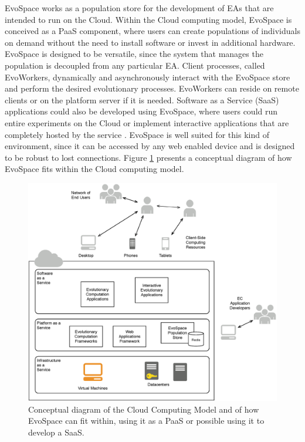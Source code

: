 EvoSpace works as a population store for the development of EAs that are intended to run on the Cloud.
Within the Cloud computing model, EvoSpace is conceived as a PaaS component, where users can create populations of individuals on demand
without the need to install software or invest in additional hardware.
EvoSpace is designed to be versatile, since the system that manages the population is decoupled from any particular EA.
Client processes, called EvoWorkers, dynamically and asynchronously interact with the EvoSpace store and perform the desired evolutionary processes.
EvoWorkers can reside on remote clients or on the platform server if it is needed.
Software as a Service (SaaS) applications could also be developed using EvoSpace, where users could run entire experiments on the
Cloud or implement interactive applications that are completely hosted by the service \cite{cloud}.
EvoSpace is well suited for this kind of environment, since it can be accessed by any web enabled device and is designed to be robust to lost connections.
Figure \ref{fig:cloud} presents a conceptual diagram of how EvoSpace fits within the Cloud computing model.

\begin{figure}[t]
    \centering
        \includegraphics[width=12cm]{cloud2.eps}
    \caption{Conceptual diagram of the Cloud Computing Model and of how EvoSpace can fit within, using it as a PaaS or possible using it to develop a SaaS.}
    \label{fig:cloud}
\end{figure}


